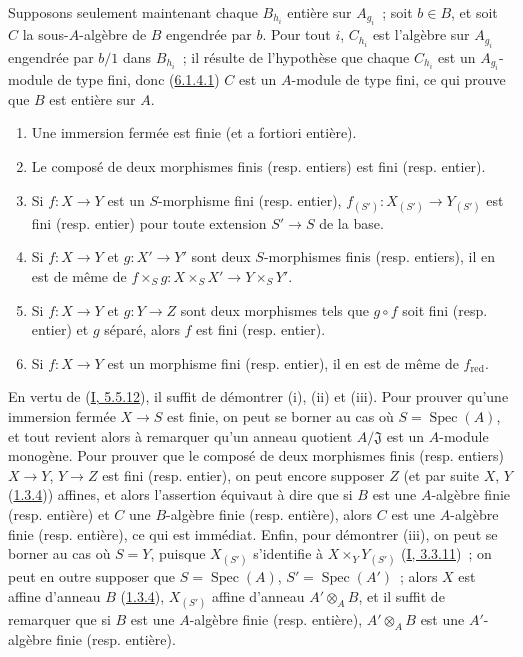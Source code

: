 Supposons seulement maintenant chaque $B_{h_i}$ entière sur $A_{g_i}$~; soit
$b\in B$, et soit $C$ la sous-$A$-algèbre de $B$ engendrée par $b$. Pour tout
$i$, $C_{h_i}$ est l'algèbre sur $A_{g_i}$ engendrée par $b/1$ dans
$B_{h_i}$~; il résulte de l'hypothèse que chaque $C_{h_i}$ est un
$A_{g_i}$-module de type fini, donc
(\hyperref[II.6.1.4.1-fr]{6.1.4.1}) $C$ est un $A$-module de type fini, ce qui
prouve que $B$ est entière sur $A$.

\begin{proposition}[6.1.5]
\label{II.6.1.5-fr}
\begin{enumerate}
\item[(i)] Une immersion fermée est finie (et a fortiori entière).
\item[(ii)] Le composé de deux morphismes finis (resp. entiers) est fini
(resp. entier).
\item[(iii)] Si $f:X\to Y$ est un $S$-morphisme fini (resp. entier),
$f_{(S')}:X_{(S')}\to Y_{(S')}$ est fini (resp. entier) pour toute extension
$S'\to S$ de la base.
\item[(iv)] Si $f:X\to Y$ et $g:X'\to Y'$ sont deux $S$-morphismes finis
(resp. entiers), il en est de même de
$f\times_S g:X\times_S X'\to Y\times_S Y'$.
\item[(v)] Si $f:X\to Y$ et $g:Y\to Z$ sont deux morphismes tels que $g\circ
f$ soit fini (resp. entier) et $g$ séparé, alors $f$ est fini (resp. entier).
\item[(vi)] Si $f:X\to Y$ est un morphisme fini (resp. entier), il en est de
même de $f_{\mathrm{red}}$.
\end{enumerate}
\end{proposition}


En vertu de (\hyperref[I.5.5.12-fr]{I, 5.5.12}), il suffit de démontrer (i),
(ii) et (iii). Pour prouver qu'une immersion fermée $X\to S$ est finie, on
peut se borner au cas où $S=\operatorname{Spec}(A)$, et tout revient alors à
remarquer qu'un anneau quotient $A/\mathfrak{J}$ est un $A$-module monogène.
Pour prouver que le composé de deux morphismes finis (resp. entiers) $X\to Y$,
$Y\to Z$ est fini (resp. entier), on peut encore supposer $Z$ (et par suite
$X$, $Y$ (\hyperref[II.1.3.4-fr]{1.3.4})) affines, et alors l'assertion
équivaut à dire que si $B$ est une $A$-algèbre finie (resp. entière) et $C$
une $B$-algèbre finie (resp. entière), alors $C$ est une $A$-algèbre finie
(resp. entière), ce qui est immédiat. Enfin, pour démontrer (iii), on peut se
borner au cas où $S=Y$, puisque $X_{(S')}$ s'identifie à
$X\times_Y Y_{(S')}$ (\hyperref[I.3.3.11-fr]{I, 3.3.11})~; on peut en outre
supposer que $S=\operatorname{Spec}(A)$, $S'=\operatorname{Spec}(A')$~; alors
$X$ est affine d'anneau $B$ (\hyperref[II.1.3.4-fr]{1.3.4}), $X_{(S')}$
affine d'anneau $A'\otimes_A B$, et il suffit de remarquer que si $B$ est une
$A$-algèbre finie (resp. entière), $A'\otimes_A B$ est une $A'$-algèbre finie
(resp. entière).

